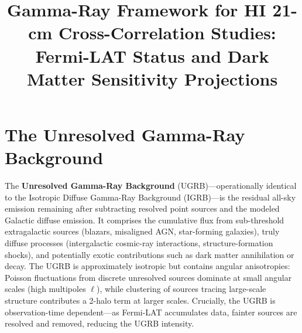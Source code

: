 \documentclass[10pt,a4paper]{article}
\title{Gamma-Ray Framework for HI 21-cm Cross-Correlation Studies:\\
Fermi-LAT Status and Dark Matter Sensitivity Projections}
\author{}
\date{}
\begin{document}



\section{The Unresolved Gamma-Ray Background}
\label{sec:ugrb}

The \textbf{Unresolved Gamma-Ray Background} (UGRB)---operationally identical to the Isotropic Diffuse Gamma-Ray Background (IGRB)---is the residual all-sky emission remaining after subtracting resolved point sources and the modeled Galactic diffuse emission. It comprises the cumulative flux from sub-threshold extragalactic sources (blazars, misaligned AGN, star-forming galaxies), truly diffuse processes (intergalactic cosmic-ray interactions, structure-formation shocks), and potentially exotic contributions such as dark matter annihilation or decay. The UGRB is approximately isotropic but contains angular anisotropies: Poisson fluctuations from discrete unresolved sources dominate at small angular scales (high multipoles $\ell$), while clustering of sources tracing large-scale structure contributes a 2-halo term at larger scales. Crucially, the UGRB is observation-time dependent---as Fermi-LAT accumulates data, fainter sources are resolved and removed, reducing the UGRB intensity.
\end{document}
